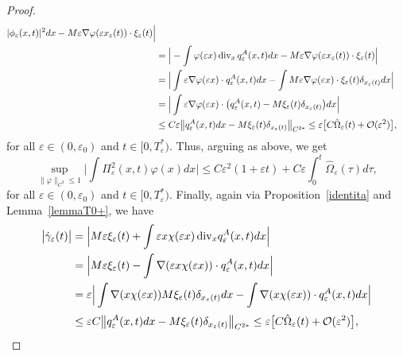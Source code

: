 \documentclass[11pt]{amsart}
\numberwithin{equation}{section}
\theoremstyle{definition}
\begin{document}
\begin{proof}
\begin{align}
|\phi_{\varepsilon}(x,t)|^2dx-M{\varepsilon}\nabla\varphi({\varepsilon} x_{\varepsilon}(t))\cdot\xi_{\varepsilon}(t)\Big| \\
& =\Big|- \int \varphi({\varepsilon} x)\,{\rm div}_{x}\, q_{\varepsilon}^A(x,t)dx-M{\varepsilon}\nabla\varphi({\varepsilon} x_{\varepsilon}(t))\cdot\xi_{\varepsilon}(t)\Big| \notag\\
& =\Big|\int {\varepsilon}\nabla \varphi({\varepsilon} x)\cdot q_{\varepsilon}^A(x,t)dx-
\int M{\varepsilon} \nabla\varphi({\varepsilon} x)\cdot\xi_{\varepsilon}(t)\delta_{x_{\varepsilon}(t)}dx\Big|   \notag \\
& =\Big|\int {\varepsilon}\nabla \varphi({\varepsilon} x)\cdot\big (q_{\varepsilon}^A(x,t)-M\xi_{\varepsilon}(t)\delta_{x_{\varepsilon}(t)}\big)dx\Big|  \notag\\
&\leq C{\varepsilon}\big\|q_{\varepsilon}^A(x,t)dx-M\xi_{\varepsilon}(t)\delta_{x_{\varepsilon}(t)}\big\|_{C^{2*}}
\leq {\varepsilon}\big[ C\hat\Omega_{\varepsilon}(t)+\mathcal O({\varepsilon}^2)\big],
\notag
\end{align}
for all ${\varepsilon}\in (0,{\varepsilon}_0)$ and $t\in [0,T^*_{\varepsilon})$. Thus, arguing
as above, we get
\begin{equation}\label{p2}
\sup_{\|\varphi\|_{C^3}\leq 1}\Big|\int
\Pi^2_{\varepsilon}(x,t)\varphi(x)dx\Big| \leq C{\varepsilon}^2(1+{\varepsilon} t)+C{\varepsilon}\int_{0}^t \hat\Omega_{\varepsilon}(\tau)d\tau,
\end{equation}
for all ${\varepsilon}\in (0,{\varepsilon}_0)$ and $t\in [0,T^*_{\varepsilon})$.
Finally, again via Proposition~\ref{identita} and Lemma~\ref{lemmaT0+}, we have
\begin{align}
	\label{estsmm3}
\big|\dot\gamma_{\varepsilon}(t)\big| &
=\Big|M{\varepsilon}\xi_{\varepsilon}(t)+\int {\varepsilon} x\chi({\varepsilon} x)\,{\rm div}_x q^A_{\varepsilon}(x,t)dx\Big|  \\
&=\Big|M{\varepsilon}\xi_{\varepsilon}(t)-\int \nabla({\varepsilon} x\chi({\varepsilon} x))\cdot q^A_{\varepsilon}(x,t)dx\Big|  \notag \\
&={\varepsilon}\Big|\int \nabla(x\chi({\varepsilon} x))M\xi_{\varepsilon}(t)\delta_{x_{\varepsilon}(t)}dx
-\int \nabla(x\chi({\varepsilon} x))\cdot q^A_{\varepsilon}(x,t)dx\Big|  \notag \\
\noalign{\vskip2pt} &\leq {\varepsilon} C\big\|q^A_{\varepsilon}(x,t)dx-M\xi_{\varepsilon}(t)\delta_{x_{\varepsilon} (t)}\big\|_{C^{2*}}
\leq {\varepsilon}\big[C\hat\Omega_{\varepsilon}(t)+\mathcal O({\varepsilon}^2)\big], \notag

\end{align}
\end{proof}
\end{document}
